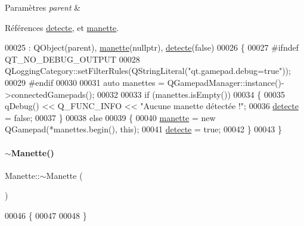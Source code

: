 \begin{DoxyParams}{Paramètres}
{\em parent} & \\
\hline
\end{DoxyParams}


Références \hyperlink{class_manette_a2b9c2c380a7bce40d2c6353d534ba6a9}{detecte}, et \hyperlink{class_manette_adc9690756093748bb851d4c1d3ba82ea}{manette}.


\begin{DoxyCode}
00025                                 : QObject(parent), \hyperlink{class_manette_adc9690756093748bb851d4c1d3ba82ea}{manette}(\textcolor{keyword}{nullptr}), 
      \hyperlink{class_manette_a2b9c2c380a7bce40d2c6353d534ba6a9}{detecte}(\textcolor{keyword}{false})
00026 \{
00027 \textcolor{preprocessor}{    #ifndef QT\_NO\_DEBUG\_OUTPUT}
00028     QLoggingCategory::setFilterRules(QStringLiteral(\textcolor{stringliteral}{"qt.gamepad.debug=true"}));
00029 \textcolor{preprocessor}{    #endif}
00030 
00031     \textcolor{keyword}{auto} manettes = QGamepadManager::instance()->connectedGamepads();
00032 
00033     \textcolor{keywordflow}{if} (manettes.isEmpty())
00034     \{
00035         qDebug() << Q\_FUNC\_INFO << \textcolor{stringliteral}{"Aucune manette détectée !"};
00036         \hyperlink{class_manette_a2b9c2c380a7bce40d2c6353d534ba6a9}{detecte} = \textcolor{keyword}{false};
00037     \}
00038     \textcolor{keywordflow}{else}
00039     \{
00040         \hyperlink{class_manette_adc9690756093748bb851d4c1d3ba82ea}{manette} = \textcolor{keyword}{new} QGamepad(*manettes.begin(), \textcolor{keyword}{this});
00041         \hyperlink{class_manette_a2b9c2c380a7bce40d2c6353d534ba6a9}{detecte} = \textcolor{keyword}{true};
00042     \}
00043 \}
\end{DoxyCode}
\mbox{\label{class_manette_a86a0cab49599b27d86c2e77f13fa54a2}} 
\paragraph{\texorpdfstring{$\sim$\+Manette()}{~Manette()}}
{\footnotesize\ttfamily Manette\+::$\sim$\+Manette (\begin{DoxyParamCaption}{ }\end{DoxyParamCaption})}


\begin{DoxyCode}
00046 \{
00047 
00048 \}
\end{DoxyCode}


